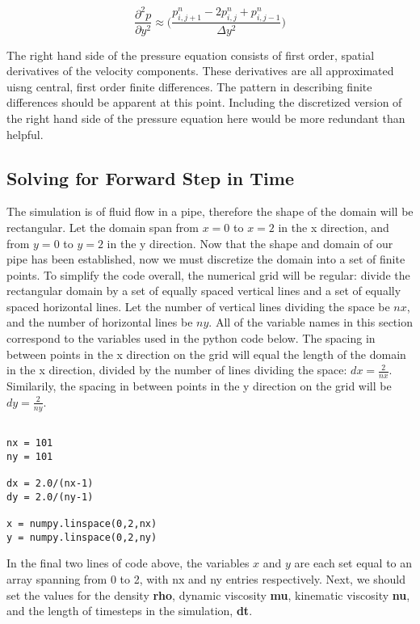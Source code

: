 \begin{equation*}
\frac{\partial^2p}{\partial{y}^2} \approx \Bigg( \frac{p^n_{i,j+1} -2p^n_{i,j} + p^n_{i,j-1}}{\Delta{y^2}} \Bigg)
\end{equation*}

The right hand side of the pressure equation consists of first order, spatial derivatives of the velocity components.
These derivatives are all approximated uisng central, first order finite differences.
The pattern in describing finite differences should be apparent at this point.
Including the discretized version of the right hand side of the pressure equation here would be more redundant than helpful.

\subsection{Solving for Forward Step in Time}


The simulation is of fluid flow in a pipe, therefore the shape of the domain will be rectangular.
Let the domain span from $x = 0$ to $x = 2$ in the x direction, and from $y = 0$ to $y = 2$ in the y direction.
Now that the shape and domain of our pipe has been established, now we must discretize the domain into a set of finite points.
To simplify the code overall, the numerical grid will be regular: divide the rectangular domain by a set of equally spaced vertical lines and a set of equally spaced horizontal lines.
Let the number of vertical lines dividing the space be $nx$, and the number of horizontal lines be $ny$.
All of the variable names in this section correspond to the variables used in the python code below.
The spacing in between points in the x direction on the grid will equal the length of the domain in the x direction, divided by the number of lines dividing the space: $dx = \frac{2}{nx}$.
Similarily, the spacing in between points in the y direction on the grid will be $dy = \frac{2}{ny}$. 

\begin{lstlisting}

nx = 101
ny = 101

dx = 2.0/(nx-1)
dy = 2.0/(ny-1)

x = numpy.linspace(0,2,nx)
y = numpy.linspace(0,2,ny)

\end{lstlisting}

In the final two lines of code above, the variables $x$ and $y$ are each set equal to an array spanning from 0 to 2, with nx and ny entries respectively. Next, we should set the values for the density \textbf{rho}, dynamic viscosity \textbf{mu}, kinematic viscosity \textbf{nu}, and the length of timesteps in the simulation, \textbf{dt}.

